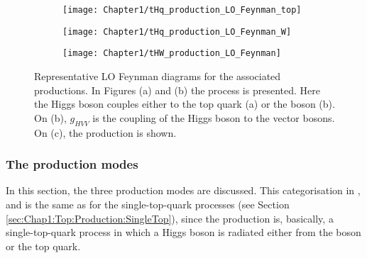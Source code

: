 \begin{figure}[h]
\centering
 \begin{subfigure}{.29\textwidth}
  \centering
  \texttt{[image: Chapter1/tHq\_production\_LO\_Feynman\_top]}
  \caption{}
  \label{fig:Chap1:tHq:Feynman_LO_top}
 \end{subfigure}%
 \begin{subfigure}{.29\textwidth}%
  \centering
  \texttt{[image: Chapter1/tHq\_production\_LO\_Feynman\_W]}
  \caption{}
  \label{fig:Chap1:tHq:Feynman_LO_W}
 \end{subfigure}%
 \begin{subfigure}{.29\textwidth}
  \centering
  \texttt{[image: Chapter1/tHW\_production\_LO\_Feynman]}
  \caption{}
  \label{fig:Chap1:tHW:Feynman_LO}
 \end{subfigure}%
    \caption{Representative LO Feynman diagrams for the \tchannel \tH associated productions.
    In Figures (a) and (b) the \tHq process is presented. Here the Higgs boson couples either to 
    the top quark (a) or the \PW boson (b). On (b), $g_{HVV}$ is the coupling of the Higgs boson 
    to the vector bosons. On (c), the \tWH production is shown.}
    \label{fig:Chap1:tHq:Feynman_LO}
\end{figure}




\subsubsection{The \tH production modes}
\label{sec:Chap1:tH:ProductionModes}
In this section, the three \tH production modes are discussed.
This categorisation in \tHq, \tWH and \schannel \tH is the same as for the 
single-top-quark processes (see Section 
\ref{sec:Chap1:Top:Production:SingleTop}),
since the \tH production is, basically, a single-top-quark process in which 
a Higgs boson is radiated either from the \PW boson or the top quark.

